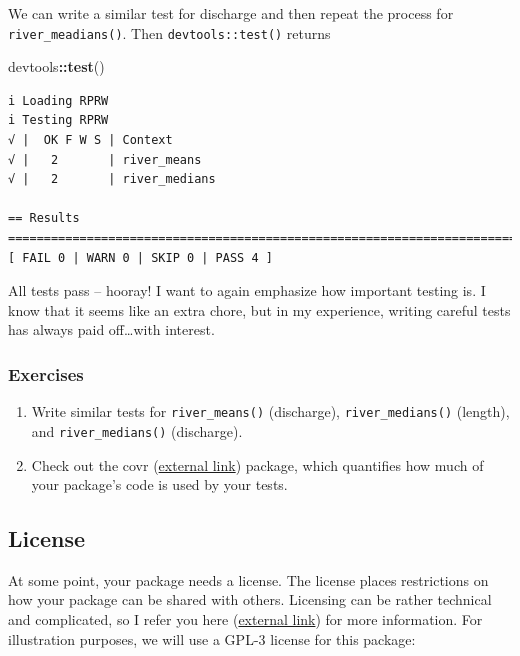 \documentclass[
]{book}
\newenvironment{Shaded}{\begin{snugshade}}{\end{snugshade}}
\newcommand{\KeywordTok}[1]{\textcolor[rgb]{0.13,0.29,0.53}{\textbf{#1}}}
\newcommand{\NormalTok}[1]{#1}
\newcommand{\OperatorTok}[1]{\textcolor[rgb]{0.81,0.36,0.00}{\textbf{#1}}}
\begin{document}
We can write a similar test for discharge and then repeat the process for \texttt{river\_meadians()}. Then \texttt{devtools::test()} returns

\begin{Shaded}
\begin{Highlighting}[]
\NormalTok{devtools}\OperatorTok{::}\KeywordTok{test}\NormalTok{()}
\end{Highlighting}
\end{Shaded}

\begin{verbatim}
i Loading RPRW
i Testing RPRW
√ |  OK F W S | Context
√ |   2       | river_means                                                         
√ |   2       | river_medians                                                       

== Results =========================================================================
[ FAIL 0 | WARN 0 | SKIP 0 | PASS 4 ]
\end{verbatim}

All tests pass -- hooray! I want to again emphasize how important testing is. I know that it seems like an extra chore, but in my experience, writing careful tests has always paid off\ldots with interest.

\hypertarget{ex-set4}{%
\subsubsection{Exercises}\label{ex-set4}}

\begin{enumerate}
\def\labelenumi{\arabic{enumi}.}
\item
  Write similar tests for \texttt{river\_means()} (discharge), \texttt{river\_medians()} (length), and \texttt{river\_medians()} (discharge).
\item
  Check out the covr (\href{https://cran.r-project.org/web/packages/covr/vignettes/how_it_works.html}{external link}) package, which quantifies how much of your package's code is used by your tests.
\end{enumerate}

\hypertarget{license}{%
\subsection{License}\label{license}}

At some point, your package needs a license. The license places restrictions on how your package can be shared with others. Licensing can be rather technical and complicated, so I refer you here (\href{https://r-pkgs.org/license.html}{external link}) for more information. For illustration purposes, we will use a GPL-3 license for this package:
\end{document}
